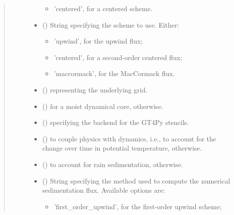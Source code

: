 \documentclass[letterpaper,10pt,english]{sphinxmanual}
\begin{document}
\begin{fulllineitems}
\begin{fulllineitems}
\begin{quote}
\begin{description}
\begin{itemize}
\begin{itemize}
\item {} 
’centered’, for a centered scheme.

\end{itemize}


\item {} 
 () \textendash{} 
String specifying the scheme to use. Either:
\begin{itemize}
\item {} 
’upwind’, for the upwind flux;

\item {} 
’centered’, for a second-order centered flux;

\item {} 
’maccormack’, for the MacCormack flux.

\end{itemize}


\item {} 
 () \textendash{} {\hyperref[\detokenize{api:tasmania.grids.grid_xyz.GridXYZ}]{}} representing the underlying grid.

\item {} 
 () \textendash{}  for a moist dynamical core,  otherwise.

\item {} 
 () \textendash{}  specifying the backend for the GT4Py stencils.

\item {} 
 () \textendash{}  to couple physics with dynamics, i.e., to account for the change over time in potential temperature,
 otherwise.

\item {} 
 () \textendash{}  to account for rain sedimentation,  otherwise.

\item {} 
 () \textendash{} 
String specifying the method used to compute the numerical sedimentation flux. Available options are:
\begin{itemize}
\item {} 
’first\_order\_upwind’, for the first-order upwind scheme;


\end{itemize}
\end{itemize}
\end{description}
\end{quote}
\end{fulllineitems}
\end{fulllineitems}
\end{document}
